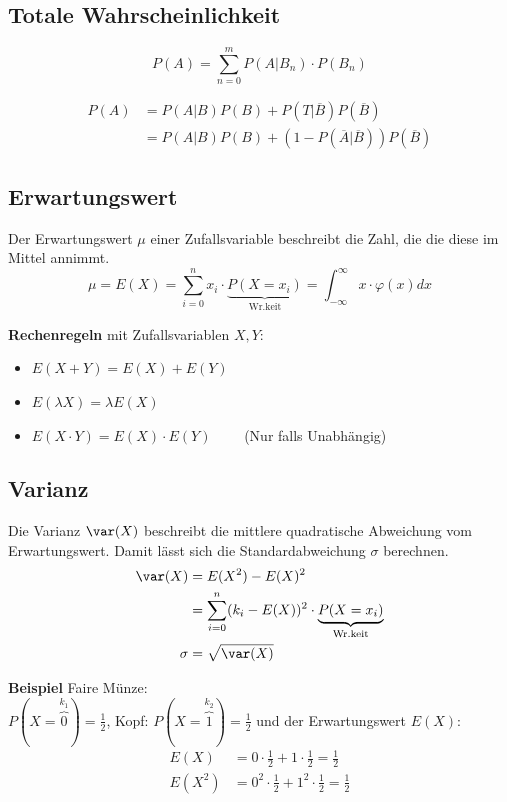 \subsection{Totale Wahrscheinlichkeit}
\[
P(A) = \sum_{n=0}^{m}P(A|B_n)\cdot P(B_n)
\]

\begin{align*}
	P(A) &=P(A|B)P(B) + P(T|\overline{B})P(\overline{B}) \\
	&= P(A|B)P(B) + (1 - P(\overline{A}|\overline{B}))P(\overline{B})
\end{align*}


\subsection{Erwartungswert}
Der Erwartungswert $\mu$ einer Zufallsvariable beschreibt die Zahl, die die diese im Mittel annimmt.
\[
\mu = E(X)= \sum\limits_{i=0}^{n}x_i\cdot \underbrace{P(X=x_i)}_\text{Wr.keit} = \int_{-\infty}^{\infty}x\cdot \varphi(x)dx
\]

\textbf{Rechenregeln} mit Zufallsvariablen $X, Y$:
\begin{itemize}[nosep]
	\item $E(X + Y) = E(X) + E(Y)$
	\item $E(\lambda X) = \lambda E(X)$ 
	\item $E(X\cdot Y) = E(X) \cdot E(Y) \qquad$  (Nur falls Unabhängig)
\end{itemize}

\subsection{Varianz}
Die Varianz $\var(X)$ beschreibt die mittlere quadratische Abweichung vom Erwartungswert. Damit lässt sich die Standardabweichung $\sigma$ berechnen.
\begin{align*}
	\var(X) &= E(X^2) - E(X)^2 \\
	&=\sum\limits_{i=0}^{n}(k_i - E(X))^2 \cdot \underbrace{P(X=x_i)}_\text{Wr.keit} \\
	\sigma &= \sqrt{\var(X)}	
\end{align*}

\noindent\textbf{Beispiel} Faire Münze:\\
$P(X = \overbrace{0}^{k_1}) = \frac{1}{2}$, Kopf: $P(X = \overbrace{1}^{k_2}) = \frac{1}{2}$ und der Erwartungswert $E(X)$: 
\begin{align*}
	E(X) &= 0\cdot \frac{1}{2} + 1\cdot\frac{1}{2} = \frac{1}{2} \\
	E(X^2) &= 0^2\cdot \frac{1}{2} + 1^2\cdot\frac{1}{2} = \frac{1}{2}
\end{align*}

